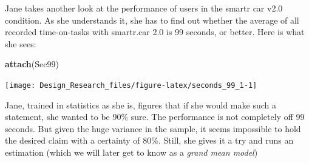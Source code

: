 \documentclass[]{svmono}
\newenvironment{Shaded}{\begin{snugshade}}{\end{snugshade}}
\newcommand{\KeywordTok}[1]{\textcolor[rgb]{0.13,0.29,0.53}{\textbf{#1}}}
\newcommand{\DataTypeTok}[1]{\textcolor[rgb]{0.13,0.29,0.53}{#1}}
\newcommand{\DecValTok}[1]{\textcolor[rgb]{0.00,0.00,0.81}{#1}}
\newcommand{\StringTok}[1]{\textcolor[rgb]{0.31,0.60,0.02}{#1}}
\newcommand{\OperatorTok}[1]{\textcolor[rgb]{0.81,0.36,0.00}{\textbf{#1}}}
\newcommand{\NormalTok}[1]{#1}
\begin{document}
Jane takes another look at the performance of users in the smartr car
v2.0 condition. As she understands it, she has to find out whether the
average of all recorded time-on-tasks with smartr.car 2.0 is 99 seconds,
or better. Here is what she sees:

\begin{Shaded}
\begin{Highlighting}[]
\KeywordTok{attach}\NormalTok{(Sec99)}
\end{Highlighting}
\end{Shaded}

\begin{Shaded}
\end{Shaded}

\texttt{[image: Design\_Research\_files/figure-latex/seconds\_99\_1-1]}

Jane, trained in statistics as she is, figures that if she would make
such a statement, she wanted to be 90\% sure. The performance is not
completely off 99 seconds. But given the huge variance in the sample, it
seems impossible to hold the desired claim with a certainty of 80\%.
Still, she gives it a try and runs an estimation (which we will later
get to know as a \emph{grand mean model})

\begin{Shaded}
\end{Shaded}
\end{document}
